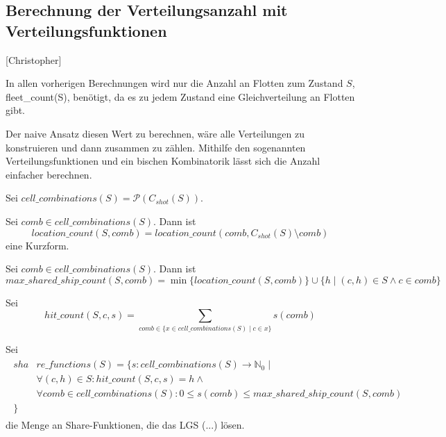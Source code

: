 \documentclass[a4paper,12pt]{llncs}
\numberwithin{equation}{section}
\begin{document}
\subsection{Berechnung der Verteilungsanzahl mit Verteilungsfunktionen}[Christopher]

In allen vorherigen Berechnungen wird nur die Anzahl an Flotten zum Zustand $S$, fleet\_count(S), benötigt, da es zu jedem Zustand eine Gleichverteilung an Flotten gibt.

Der naive Ansatz diesen Wert zu berechnen, wäre alle Verteilungen zu konstruieren und dann zusammen zu zählen.
Mithilfe den sogenannten Verteilungsfunktionen und ein bischen Kombinatorik lässt sich die Anzahl einfacher berechnen.

\begin{definition}
Sei $cell\_combinations(S)=\mathcal{P}(C_{shot}(S))$.
\end{definition}

\begin{definition}
Sei $comb \in cell\_combinations(S)$. Dann ist
\[
location\_count(S,comb)=location\_count(comb, C_{shot}(S) \setminus comb)
\]
eine Kurzform.
\end{definition}

\begin{definition}
Sei $comb \in cell\_combinations(S)$. Dann ist
\[
max\_shared\_ship\_count(S,comb)=\min\{location\_count(S, comb)\} \cup \{h \mid (c,h) \in S \wedge c \in comb\}
\]
\end{definition}

\begin{definition}
Sei
\[
hit\_count(S, c, s)=\sum_{comb \in \{x \in cell\_combinations(S) \mid c \in x\}}{s(comb)}
\]
\end{definition}

\begin{definition}
Sei
\begin{align}
\begin{split}
sha&re\_functions(S)=\{s \colon cell\_combinations(S) \rightarrow \mathbb{N}_0 \mid\\
&\forall{(c,h) \in S}\colon hit\_count(S, c, s)=h \wedge \\
&\forall{comb \in cell\_combinations(S)} \colon 0 \leq s(comb) \leq max\_shared\_ship\_count(S, comb)\\
\}\;\;\;& \nonumber
\end{split}
\end{align}
die Menge an Share-Funktionen, die das LGS (...) lösen.
\end{definition}
\end{document}
